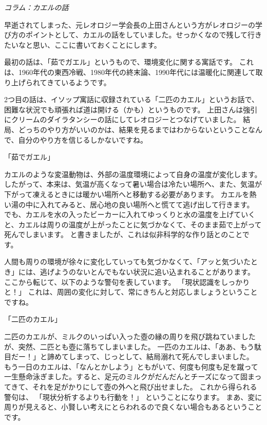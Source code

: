 \documentclass[uplatex,dvipdfmx,a4paper,11pt]{jsarticle}
\begin{document}
	\begin{longartdeco}
		\begin{center}
		\emph{コラム：カエルの話}	
		\end{center}
	
		早逝されてしまった、元レオロジー学会長の上田さんという方がレオロジーの学び方のポイントとして、カエルの話をしていました。せっかくなので残して行きたいなと思い、ここに書いておくことにします。

	最初の話は、「茹でガエル」というもので、環境変化に関する寓話です。
	これは、1960年代の東西冷戦、1980年代の終末論、1990年代には温暖化に関連して取り上げられてきているようです。

	2つ目の話は、イソップ寓話に収録されている「二匹のカエル」というお話で、困難な状況でも頑張れば道は開ける（かも）というものです。
	上田さんは強引にクリームのダイラタンシーの話にしてレオロジーとつなげていました。
	結局、どっちのやり方がいいのかは、結果を見るまではわからないということなんで、自分のやり方を信じるしかないですね。

	「茹でガエル」

	カエルのような変温動物は、外部の温度環境によって自身の温度が変化します。
	したがって、本来は、気温が高くなって暑い場合は冷たい場所へ、また、気温が下がって凍えるときには暖かい場所へと移動する必要があります。
	カエルを熱い湯の中に入れてみると、居心地の良い場所へと慌てて逃げ出して行きます。
	でも、カエルを水の入ったビーカーに入れてゆっくりと水の温度を上げていくと、カエルは周りの温度が上がったことに気づかなくて、そのまま茹で上がって死んでしまいます。
	と書きましたが、これは似非科学的な作り話とのことです。

	人間も周りの環境が徐々に変化していっても気づかなくて、「アッと気づいたとき」には、逃げようのないとんでもない状況に追い込まれることがあります。
	ここから転じて、以下のような警句を表しています。
	「現状認識をしっかりと！」
	これは、周囲の変化に対して、常にきちんと対応しましょうということですね。

	「二匹のカエル」

	二匹のカエルが、ミルクのいっぱい入った壺の縁の周りを飛び跳ねていましたが、突然、二匹とも壺に落ちてしまいました。
	一匹のカエルは、「ああ、もう駄目だー！」と諦めてしまって、じっとして、結局溺れて死んでしまいました。
	もう一日のカエルは、「なんとかしよう」ともがいて、何度も何度も足を蹴って一生懸命泳ぎました。すると、足元のミルクがだんだんとチーズになって固まってきて、それを足がかりにして壺の外へと飛び出せました。
	これから得られる警句は、
	「現状分析するよりも行動を！」
	ということになります。
	まあ、変に周りが見えると、小賢しい考えにとらわれるので良くない場合もあるということです。
	
	\end{longartdeco}
\end{document}
